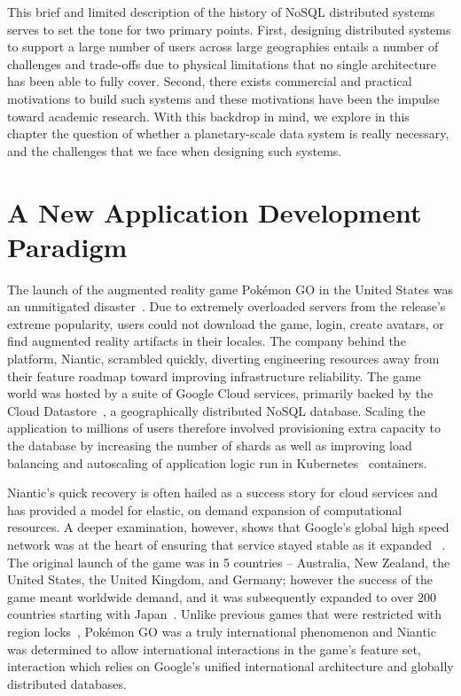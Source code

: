 This brief and limited description of the history of NoSQL distributed systems serves to set the tone for two primary points.
First, designing distributed systems to support a large number of users across large geographies entails a number of challenges and trade-offs due to physical limitations that no single architecture has been able to fully cover.
Second, there exists commercial and practical motivations to build such systems and these motivations have been the impulse toward academic research.
With this backdrop in mind, we explore in this chapter the question of whether a planetary-scale data system is really necessary, and the challenges that we face when designing such systems.

\section{A New Application Development Paradigm}


The launch of the augmented reality game Pokémon GO in the United States was an unmitigated disaster~\cite{kain_pokemon_2016}.
Due to extremely overloaded servers from the release's extreme popularity, users could not download the game, login, create avatars, or find augmented reality artifacts in their locales.
The company behind the platform, Niantic, scrambled quickly, diverting engineering resources away from their feature roadmap toward improving infrastructure reliability.
The game world was hosted by a suite of Google Cloud services, primarily backed by the Cloud Datastore~\cite{cloud_datastore}, a geographically distributed NoSQL database.
Scaling the application to millions of users therefore involved provisioning extra capacity to the database by increasing the number of shards as well as improving load balancing and autoscaling of application logic run in Kubernetes~\cite{Kubernetes} containers.

Niantic's quick recovery is often hailed as a success story for cloud services and has provided a model for elastic, on demand expansion of computational resources.
A deeper examination, however, shows that Google's global high speed network was at the heart of ensuring that service stayed stable as it expanded ~\cite{stone_bringing_2016}.
The original launch of the game was in 5 countries -- Australia, New Zealand, the United States, the United Kingdom, and Germany; however the success of the game meant worldwide demand, and it was subsequently expanded to over 200 countries starting with Japan~\cite{yamazaki_developer_2016}.
Unlike previous games that were restricted with region locks~\cite{region_locking}, Pokémon GO was a truly international phenomenon and Niantic was determined to allow international interactions in the game's feature set, interaction which relies on Google's unified international architecture and globally distributed databases.

